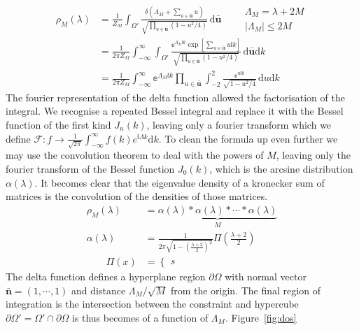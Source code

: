 \documentclass{article}[12pt]
\numberwithin{equation}{section}
\begin{document}
\begin{align*}
  \rho_M(\lambda)&=\frac{1}{Z_M}
  \int_{\Omega'}\!
  \frac{\delta(\Lambda_M+\sum_{u\in\bar{\mathbf{u}}}u)}
  {\sqrt{\prod_{u\in\bar{\mathbf{u}}}(1-u^2/4) }}
  \,\mathrm{d}\bar{\mathbf{u}}
  \qquad
  \begin{matrix}
    \Lambda_M=\lambda+2M \\
    |\Lambda_M|\leq2M
  \end{matrix}\\
  &=\frac{1}{2\pi Z_M}
  \int_{-\infty}^{\infty}\int_{\Omega'}\!
  \frac{\mathbb{e}^{\Lambda_M\mathbb{i}k}\exp[\sum_{u\in\bar{\mathbf{u}}}u\mathbb{i}k]}
  {\sqrt{\prod_{u\in\bar{\mathbf{u}}}(1-u^2/4) }}
  \,\mathrm{d}\bar{\mathbf{u}}\mathrm{d}k\\
  &=\frac{1}{2\pi Z_M}
  \int_{-\infty}^{\infty}\mathbb{e}^{\Lambda_M\mathbb{i}k}
  \prod_{u\in\bar{\mathbf{u}}}\int_{-2}^{2}\!
  \frac{\mathbb{e}^{u\mathbb{i}k}}
  {\sqrt{1-u^2/4}}
  \,\mathrm{d}u\mathrm{d}k
\end{align*}
The fourier representation of the delta function allowed the
factorisation of the integral. We recognise a repeated Bessel
integral and replace it with the Bessel function of the first kind
$J_n(k)$, leaving only a fourier transform which we define
$ \mathcal{F} :
f\rightarrow \frac{1}{\sqrt{2\pi}}
\int_{-\infty}^{\infty}f(k)e^{\mathbb{i}\Lambda k}\mathrm{d}k$. To clean
the formula up even further we may use the convolution
theorem to deal with the powers of $M$, leaving only the fourier
transform of the Bessel function $J_0(k)$, which is the arcsine
distribution $\alpha(\lambda)$. It becomes clear that the eigenvalue
density of a kronecker sum of matrices is the convolution of the densities
of those matrices.
\begin{align}
  \rho_M(\lambda)&=\underbrace{
  \alpha(\lambda)*\alpha(\lambda)*\cdots*\alpha(\lambda)}_{M}\\
  \alpha(\lambda)&=\frac{1}{2\pi\sqrt{1-\left(\frac{\lambda+2}{2}\right)^2}}
  \Pi\left(\frac{\lambda+2}{2}\right)\\
  \qquad\Pi(x)&=
  \begin{cases}
    s
  \end{cases}
\end{align}
The delta function defines a hyperplane region $\partial\Omega$ with
normal vector $\bar{\mathbf{n}}=(1,\cdots,1)$ and distance
$\Lambda_M/\sqrt{M}$ from the origin. The final region of
integration is the intersection between the constraint and hypercube
$\partial\Omega'=\Omega'\cap\partial\Omega$
is thus becomes of a function of $\Lambda_M$. Figure~\ref{fig:dos}
\end{document}
